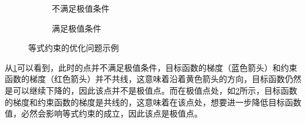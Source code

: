 \begin{solution}
    \begin{figure}[htb!]
        \centering
        \begin{subfigure}{.4\textwidth}
            \centering
            
            \caption{不满足极值条件}
            \label{fig_basic_kkt_eg_1}
        \end{subfigure}
        \begin{subfigure}{.4\textwidth}
            \centering
            
            \caption{满足极值条件}
            \label{fig_basic_kkt_eg_2}
        \end{subfigure}
        \caption{等式约束的优化问题示例}
        \label{fig_basic_kkt_eg}
    \end{figure}

    从\cref{fig_basic_kkt_eg_1}可以看到，此时的点并不满足极值条件，目标函数的梯度（蓝色箭头）和约束函数的梯度（红色箭头）并不共线，这意味着沿着黄色箭头的方向，目标函数仍然是可以继续下降的，因此该点并不是极值点。而在极值点处，如\cref{fig_basic_kkt_eg_2}所示，目标函数的梯度和约束函数的梯度是共线的，这意味着在该点处，想要进一步降低目标函数值，必然会影响等式约束的成立，因此该点是极值点。
\end{solution}

